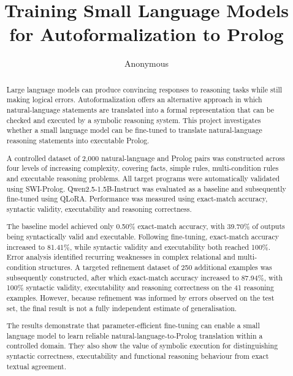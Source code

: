 \documentclass[11pt]{article} %
\title{Training Small Language Models for Autoformalization to Prolog}
\author{Anonymous}
\theoremstyle{plain}
\theoremstyle{definition}
\begin{document}
\maketitle

\declaration

\begin{abstract}

Large language models can produce convincing responses to reasoning tasks while
still making logical errors. Autoformalization offers an alternative approach in which
natural-language statements are translated into a formal representation that can be
checked and executed by a symbolic reasoning system. This project investigates
whether a small language model can be fine-tuned to translate natural-language
reasoning statements into executable Prolog.

A controlled dataset of 2,000 natural-language and Prolog pairs was constructed
across four levels of increasing complexity, covering facts, simple rules,
multi-condition rules and executable reasoning problems. All target programs were
automatically validated using SWI-Prolog. Qwen2.5-1.5B-Instruct was evaluated as a
baseline and subsequently fine-tuned using QLoRA. Performance was measured using
exact-match accuracy, syntactic validity, executability and reasoning correctness.

The baseline model achieved only 0.50\% exact-match accuracy, with 39.70\% of
outputs being syntactically valid and executable. Following fine-tuning, exact-match
accuracy increased to 81.41\%, while syntactic validity and executability both reached
100\%. Error analysis identified recurring weaknesses in complex relational and
multi-condition structures. A targeted refinement dataset of 250 additional examples
was subsequently constructed, after which exact-match accuracy increased to 87.94\%,
with 100\% syntactic validity, executability and reasoning correctness on the 41
reasoning examples. However, because refinement was informed by errors observed
on the test set, the final result is not a fully independent estimate of generalisation.

The results demonstrate that parameter-efficient fine-tuning can enable a small
language model to learn reliable natural-language-to-Prolog translation within a
controlled domain. They also show the value of symbolic execution for distinguishing
syntactic correctness, executability and functional reasoning behaviour from exact
textual agreement.


\end{abstract}
\end{document}
